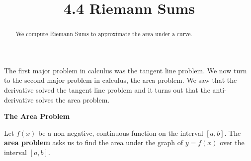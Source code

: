 \documentclass{ximera}
\title{4.4 Riemann Sums}
\begin{document}
\begin{abstract}
We compute Riemann Sums to approximate the area under a curve.
\end{abstract}

\maketitle

The first major problem in calculus was the tangent line problem. We now turn to the second major problem in calculus, the area problem.
We saw that the derivative solved the tangent line problem and it turns out that the anti-derivative solves the area problem.
\begin{center}
\textbf{The Area Problem}
\end{center}

Let $f(x)$ be a non-negative, continuous function on the interval $[a,b]$. The \textbf{area problem} asks us to find the area under the graph of $y = f(x)$
over the interval $[a,b]$.
\end{document}
